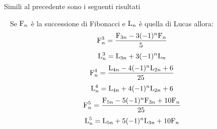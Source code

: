 Simili al precedente sono  i seguenti risultati
\begin{thm}~\cite{Rabinowitz_1996}\label{thm:FibpotSommadue}
Se $\mathrm{F}_{n}$ è la successione di Fibonacci e  $\mathrm{L}_{n}$ è quella di Lucas allora:
\begin{equation}
	\mathrm{F}_{n}^3=\dfrac{\mathrm{F}_{3n}-3(-1)^n\mathrm{F}_{n}}{5}
\end{equation}\label{eqn:FibCubSomma}
\begin{equation}
	\mathrm{L}_{n}^3=\mathrm{L}_{3n}+3(-1)^n\mathrm{L}_{n}
\end{equation}\label{eqn:LucCubSomma}
\begin{equation}
	\mathrm{F}_{n}^4=\dfrac{\mathrm{L}_{4n}-4(-1)^n\mathrm{L}_{2n}+6}{25}
\end{equation}\label{eqn:FibQuartaSomma}
\begin{equation}
	\mathrm{L}_{n}^4=\mathrm{L}_{4n}+4(-1)^n\mathrm{L}_{2n}+6
\end{equation}\label{eqn:LucQuartaSomma}
\begin{equation}
	\mathrm{F}_{n}^5=\dfrac{\mathrm{F}_{5n}-5(-1)^n\mathrm{F}_{3n}+10\mathrm{F}_{n}}{25}
\end{equation}\label{eqn:FibQuintaaSomma}
\begin{equation}
	\mathrm{L}_{n}^5=\mathrm{L}_{5n}+5(-1)^n\mathrm{L}_{3n}+10\mathrm{F}_{n}
\end{equation}\label{eqn:LucQuintaaSomma}
\end{thm}
